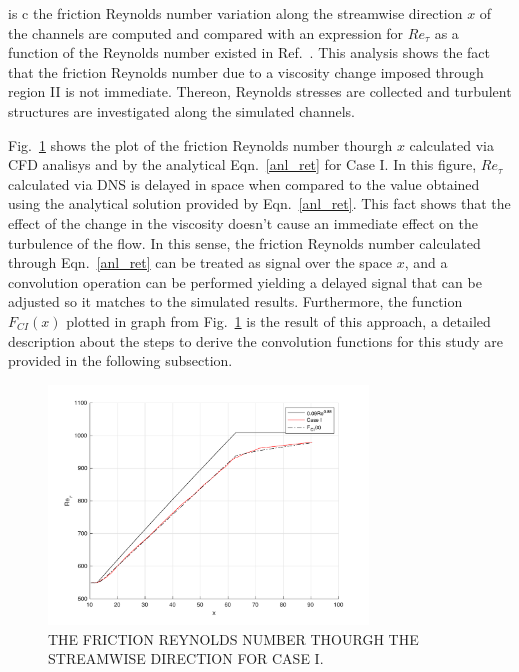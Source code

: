 \documentclass[twocolumn,10pt]{asme2e}
\begin{document}
is c the friction Reynolds number variation along the streamwise direction \(x\) of the channels are computed and compared with an expression for \(Re_{\tau}\) as a function of the Reynolds number existed in Ref.~\cite{pope}. This analysis shows the fact that the friction Reynolds number due to a viscosity change imposed through region II is not immediate. Thereon, Reynolds stresses are collected and turbulent structures are investigated along the simulated channels.

Fig.~\ref{fig:re_t_x} shows the plot of the friction Reynolds number thourgh \(x\) calculated via CFD analisys and by the analytical Eqn.~\ref{anl_ret} for Case I. In this figure, \(Re_{\tau}\) calculated via DNS is delayed in space when compared to the value obtained using the analytical solution provided by Eqn.~\ref{anl_ret}. This fact shows that the effect of the change in the viscosity doesn't cause an immediate effect on the turbulence of the flow. In this sense, the friction Reynolds number calculated through Eqn.~\ref{anl_ret} can be treated as signal over the space \(x\), and a convolution operation can be performed yielding a delayed signal that can be adjusted so it matches to the simulated results. Furthermore, the function \(F_{CI}(x)\) plotted in graph from Fig.~\ref{fig:re_t_x} is the result of this approach, a detailed description about the steps to derive the convolution functions for this study are provided in the following subsection.

\begin{figure}[!htbp]
\begin{center}
\setlength{\unitlength}{0.012500in}%
  \includegraphics[trim = 20mm 15mm 20mm 10mm, width = 85mm]{convolution_CI.pdf}
\end{center}
  \caption{THE FRICTION REYNOLDS NUMBER THOURGH THE STREAMWISE DIRECTION FOR CASE I.}
  \label{fig:re_t_x}
\end{figure}
\end{document}
